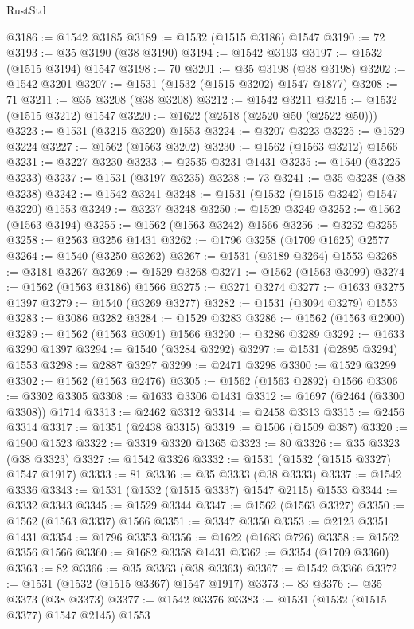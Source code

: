 \begin{lexlean}{RustStd}
\begin{coremodule}
@3186 := @1542 @3185
@3189 := @1532 (@1515 @3186) @1547
@3190 := 72
@3193 := @35 @3190 (@38 @3190)
@3194 := @1542 @3193
@3197 := @1532 (@1515 @3194) @1547
@3198 := 70
@3201 := @35 @3198 (@38 @3198)
@3202 := @1542 @3201
@3207 := @1531 (@1532 (@1515 @3202) @1547 @1877)
@3208 := 71
@3211 := @35 @3208 (@38 @3208)
@3212 := @1542 @3211
@3215 := @1532 (@1515 @3212) @1547
@3220 := @1622 (@2518 (@2520 @50 (@2522 @50)))
@3223 := @1531 (@3215 @3220) @1553
@3224 := @3207 @3223
@3225 := @1529 @3224
@3227 := @1562 (@1563 @3202)
@3230 := @1562 (@1563 @3212) @1566
@3231 := @3227 @3230
@3233 := @2535 @3231 @1431
@3235 := @1540 (@3225 @3233)
@3237 := @1531 (@3197 @3235)
@3238 := 73
@3241 := @35 @3238 (@38 @3238)
@3242 := @1542 @3241
@3248 := @1531 (@1532 (@1515 @3242) @1547 @3220) @1553
@3249 := @3237 @3248
@3250 := @1529 @3249
@3252 := @1562 (@1563 @3194)
@3255 := @1562 (@1563 @3242) @1566
@3256 := @3252 @3255
@3258 := @2563 @3256 @1431
@3262 := @1796 @3258 (@1709 @1625) @2577
@3264 := @1540 (@3250 @3262)
@3267 := @1531 (@3189 @3264) @1553
@3268 := @3181 @3267
@3269 := @1529 @3268
@3271 := @1562 (@1563 @3099)
@3274 := @1562 (@1563 @3186) @1566
@3275 := @3271 @3274
@3277 := @1633 @3275 @1397
@3279 := @1540 (@3269 @3277)
@3282 := @1531 (@3094 @3279) @1553
@3283 := @3086 @3282
@3284 := @1529 @3283
@3286 := @1562 (@1563 @2900)
@3289 := @1562 (@1563 @3091) @1566
@3290 := @3286 @3289
@3292 := @1633 @3290 @1397
@3294 := @1540 (@3284 @3292)
@3297 := @1531 (@2895 @3294) @1553
@3298 := @2887 @3297
@3299 := @2471 @3298
@3300 := @1529 @3299
@3302 := @1562 (@1563 @2476)
@3305 := @1562 (@1563 @2892) @1566
@3306 := @3302 @3305
@3308 := @1633 @3306 @1431
@3312 := @1697 (@2464 (@3300 @3308)) @1714
@3313 := @2462 @3312
@3314 := @2458 @3313
@3315 := @2456 @3314
@3317 := @1351 (@2438 @3315)
@3319 := @1506 (@1509 @387)
@3320 := @1900 @1523
@3322 := @3319 @3320 @1365
@3323 := 80
@3326 := @35 @3323 (@38 @3323)
@3327 := @1542 @3326
@3332 := @1531 (@1532 (@1515 @3327) @1547 @1917)
@3333 := 81
@3336 := @35 @3333 (@38 @3333)
@3337 := @1542 @3336
@3343 := @1531 (@1532 (@1515 @3337) @1547 @2115) @1553
@3344 := @3332 @3343
@3345 := @1529 @3344
@3347 := @1562 (@1563 @3327)
@3350 := @1562 (@1563 @3337) @1566
@3351 := @3347 @3350
@3353 := @2123 @3351 @1431
@3354 := @1796 @3353
@3356 := @1622 (@1683 @726)
@3358 := @1562 @3356 @1566
@3360 := @1682 @3358 @1431
@3362 := @3354 (@1709 @3360)
@3363 := 82
@3366 := @35 @3363 (@38 @3363)
@3367 := @1542 @3366
@3372 := @1531 (@1532 (@1515 @3367) @1547 @1917)
@3373 := 83
@3376 := @35 @3373 (@38 @3373)
@3377 := @1542 @3376
@3383 := @1531 (@1532 (@1515 @3377) @1547 @2145) @1553

\end{coremodule}
\end{lexlean}
